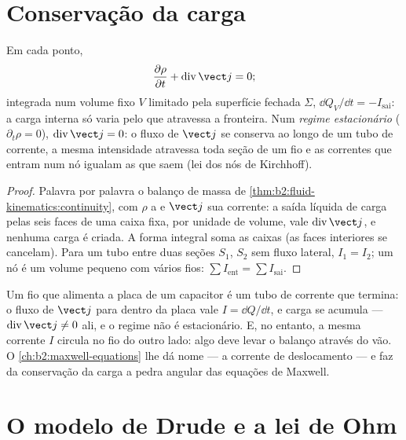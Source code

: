 \section{Conservação da carga}

\begin{theorem}\label{thm:b2:charges-currents-conduction:conservation}
Em cada ponto,
\[
\frac{\partial\rho}{\partial t} + \operatorname{div}\vect j = 0 ;
\]
integrada num volume fixo $V$ limitado pela superfície fechada $\Sigma$,
$\dd Q_V/\dd t = -I_{\text{sai}}$: a carga interna só varia pelo que
atravessa a fronteira. Num \emph{regime estacionário} ($\partial_t\rho = 0$),
$\operatorname{div}\vect j = 0$: o fluxo de $\vect j$ se conserva ao longo de um tubo
de corrente, a mesma intensidade atravessa toda seção de um fio e
as correntes que entram num nó igualam as que saem (lei dos nós de Kirchhoff).
\end{theorem}

\begin{proof}
Palavra por palavra o balanço de massa de \cref{thm:b2:fluid-kinematics:continuity},
com $\rho$ a  e $\vect j$ sua corrente: a saída líquida
de carga pelas seis faces de uma caixa fixa, por unidade de volume, vale
$\operatorname{div}\vect j$, e nenhuma carga é criada. A forma integral soma
as caixas (as faces interiores se cancelam). Para um tubo entre duas seções
$S_1$, $S_2$ sem fluxo lateral, $I_1 = I_2$; um nó é um
volume pequeno com vários fios: $\sum I_{\text{ent}} = \sum I_{\text{sai}}$.
\end{proof}

\begin{remark}\label{rem:b2:charges-currents-conduction:capacitor}
Um fio que alimenta a placa de um capacitor é um tubo de corrente que termina: o
fluxo de $\vect j$ para dentro da placa vale $I = \dd Q/\dd t$, e carga se acumula
--- $\operatorname{div}\vect j \ne 0$ ali, e o regime não é estacionário.
E, no entanto, a mesma corrente $I$ circula no fio do outro lado: algo
deve levar o balanço através do vão. O \cref{ch:b2:maxwell-equations}
lhe dá nome --- a corrente de deslocamento --- e faz da conservação da
carga a pedra angular das equações de Maxwell.
\end{remark}

\section{O modelo de Drude e a lei de Ohm}

